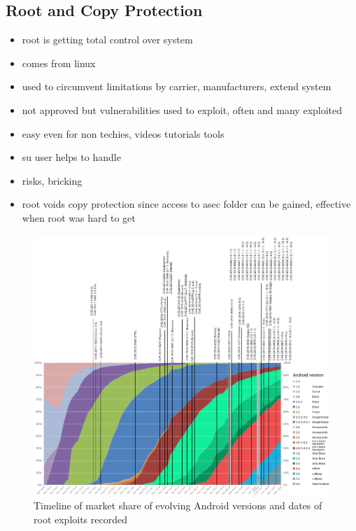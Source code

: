 \subsection{Root and Copy Protection} \label{subsection:android-copyroot}
\begin{itemize}
  \item root is getting total control over system
  \item comes from linux
  \item used to circumvent limitations by carrier, manufacturers, extend system
  \item not approved but vulnerabilities used to exploit, often and many exploited
  \item easy even for non techies, videos tutorials tools
  \item su user helps to handle
  \item risks, bricking
  \item root voids copy protection since access to asec folder can be gained, effective when root was hard to get
\end{itemize}
\begin{figure}[h]
    \centering
    \includegraphics[width=1\textwidth]{data/timeline.png}
    \caption{Timeline of market share of evolving Android versions and dates of root exploits recorded \cite{distributionRoot} \cite{androidVulnerabilities} \cite{cveAndroidPriv} \cite{cveDetails}}
    \label{fig:root}
\end{figure}
